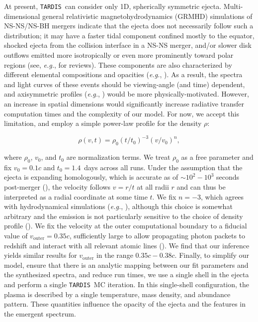 \documentclass[twocolumn, twocolappendix]{aastex63}
\def\TARDIS{\texttt{TARDIS}}
\def\eg{{\it e.g.}}
\begin{document}
At present, \TARDIS~can consider only 1D, spherically symmetric ejecta. Multi-dimensional general relativistic magnetohydrodynamics (GRMHD) simulations of NS-NS/NS-BH mergers indicate that the ejecta does not necessarily follow such a distribution; it may have a faster tidal component confined mostly to the equator, shocked ejecta from the collision interface in a NS-NS merger, and/or slower disk outflows emitted more isotropically or even more prominently toward polar regions (see, \eg, \citealt{fernandez16, baiotti17, shibata19, radice20} for reviews). These components are also characterized by different elemental compositions and opacities (\eg, \citealt{wanajo14, just15, mendoza-temis15, wu16}). As a result, the spectra and light curves of these events should be viewing-angle (and time) dependent, and axisymmetric profiles (\eg, \citealt{wollaeger18, bulla19, darbha20, kawaguchi20, heinzel21, korobkin21, wollaeger21}) would be more physically-motivated. However, an increase in spatial dimensions would significantly increase radiative transfer computation times and the complexity of our model. For now, we accept this limitation, and employ a simple power-law profile for the density $\rho$:

\begin{equation}\label{eqn:plaw_dens}
    \rho(v, t) = \rho_0 (t / t_0)^{-3} (v / v_0)^{n} , 
\end{equation}

\noindent where $\rho_0$, $v_0$, and $t_0$ are normalization terms.  We treat $\rho_0$ as a free parameter and fix $v_0 = 0.1c$ and $t_0 = 1.4$~days across all runs. Under the assumption that the ejecta is expanding homologously, which is accurate as of $\sim 10^2-10^3 $ seconds post-merger (\citealt{metzger10, kasen13, rosswog14, grossman14}), the velocity follows $v = r/t$ at all radii $r$ and can thus be interpreted as a radial coordinate at some time $t$. We fix $n=-3$, which agrees with hydrodynamical simulations (\eg, \citealt{kasen17, tanaka17, watson19}), although this choice is somewhat arbitrary and the emission is not particularly sensitive to the choice of density profile (\citealt{kasen17}). We fix the velocity at the outer computational boundary to a fiducial value of $v_{\mathrm{outer}} = 0.35c$, sufficiently large to allow propagating photon packets to redshift and interact with all relevant atomic lines (\citealt{gillanders22}). We find that our inference yields similar results for $v_{\mathrm{outer}}$ in the range $0.35c - 0.38c$. Finally, to simplify our model, ensure that there is an analytic mapping between our fit parameters and the synthesized spectra, and reduce run times, we use a single shell in the ejecta and perform a single \TARDIS~MC iteration. In this single-shell configuration, the plasma is described by a single temperature, mass density, and abundance pattern. These quantities influence the opacity of the ejecta and the features in the emergent spectrum.
\end{document}
